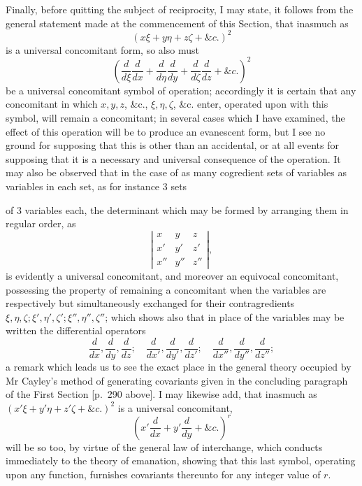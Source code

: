 \documentclass[11pt]{article}
\newcommand{\sourcepage}[1]{\marginpar{\scriptsize p.~#1}}
\begin{document}
{{Finally, before quitting the subject of reciprocity, I may state, it follows from the general statement made at the commencement of this Section, that inasmuch as
\[
(x\xi+y\eta+z\zeta+\&c.)^2
\]
is a universal concomitant form, so also must
\[
\left(\frac{d}{d\xi}\frac{d}{dx}+\frac{d}{d\eta}\frac{d}{dy}
+\frac{d}{d\zeta}\frac{d}{dz}+\&c.\right)^2
\]
be a universal concomitant symbol of operation; accordingly it is certain that any concomitant in which $x,y,z$, \&c., $\xi,\eta,\zeta$, \&c. enter, operated upon with this symbol, will remain a concomitant; in several cases which I have examined, the effect of this operation will be to produce an evanescent form, but I see no ground for supposing that this is other than an accidental, or at all events for supposing that it is a necessary and universal consequence of the operation. It may also be observed that in the case of as many cogredient sets of variables as variables in each set, as for instance 3 sets

\sourcepage{338}
of 3 variables each, the determinant which may be formed by arranging them in regular order, as
\[
\left|\begin{array}{ccc}
x&y&z\\
x'&y'&z'\\
x''&y''&z''
\end{array}\right|,
\]
is evidently a universal concomitant, and moreover an equivocal concomitant, possessing the property of remaining a concomitant when the variables are respectively but simultaneously exchanged for their contragredients $\xi,\eta,\zeta;\xi',\eta',\zeta';\xi'',\eta'',\zeta''$; which shows also that in place of the variables may be written the differential operators
\[
\frac{d}{dx},\frac{d}{dy},\frac{d}{dz};
\quad
\frac{d}{dx'},\frac{d}{dy'},\frac{d}{dz'};
\quad
\frac{d}{dx''},\frac{d}{dy''},\frac{d}{dz''};
\]
a remark which leads us to see the exact place in the general theory occupied by Mr Cayley's method of generating covariants given in the concluding paragraph of the First Section [p.~290 above]. I may likewise add, that inasmuch as $(x'\xi+y'\eta+z'\zeta+\&c.)^2$ is a universal concomitant,
\[
\left(x'\frac{d}{dx}+y'\frac{d}{dy}+\&c.\right)^r
\]
will be so too, by virtue of the general law of interchange, which conducts immediately to the theory of emanation, showing that this last symbol, operating upon any function, furnishes covariants thereunto for any integer value of $r$.

}}
\end{document}
